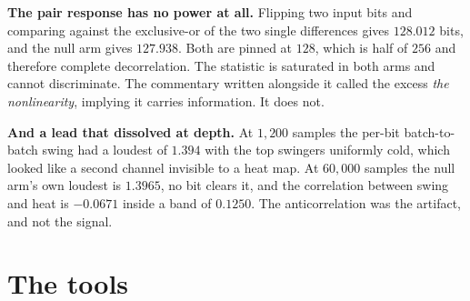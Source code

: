 \textbf{The pair response has no power at all.} Flipping two input bits and comparing against the exclusive-or of the two single differences gives \(128.012\) bits, and the null arm gives \(127.938\). Both are pinned at \(128\), which is half of \(256\) and therefore complete decorrelation. The statistic is saturated in both arms and cannot discriminate. The commentary written alongside it called the excess \emph{the nonlinearity}, implying it carries information. It does not.

\textbf{And a lead that dissolved at depth.} At \(1{,}200\) samples the per-bit batch-to-batch swing had a loudest of \(1.394\) with the top swingers uniformly cold, which looked like a second channel invisible to a heat map. At \(60{,}000\) samples the null arm's own loudest is \(1.3965\), no bit clears it, and the correlation between swing and heat is \(-0.0671\) inside a band of \(0.1250\). The anticorrelation was the artifact, and not the signal.

\section{The tools}

